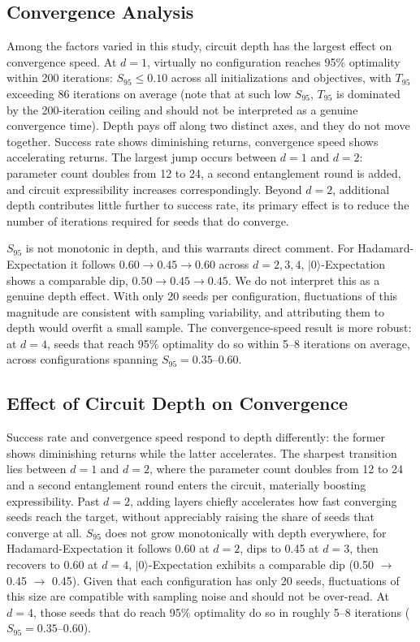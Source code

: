 \documentclass[runningheads]{llncs}
\begin{document}
\subsection{Convergence Analysis}

Among the factors varied in this study, circuit depth has the largest effect on convergence speed. At $d = 1$, virtually no configuration reaches 95\% optimality within 200 iterations: $S_{95} \leq 0.10$ across all initializations and objectives, with $T_{95}$ exceeding 86 iterations on average (note that at such low $S_{95}$, $T_{95}$ is dominated by the 200-iteration ceiling and should not be interpreted as a genuine convergence time). Depth pays off along two distinct axes, and they do not move together. Success rate shows diminishing returns, convergence speed shows accelerating returns. The largest jump occurs between $d=1$ and $d=2$: parameter count doubles from 12 to 24, a second entanglement round is added, and circuit expressibility increases correspondingly. Beyond $d=2$, additional depth contributes little further to success rate, its primary effect is to reduce the number of iterations required for seeds that do converge.

$S_{95}$ is not monotonic in depth, and this warrants direct comment. For Hadamard-Expectation it follows $0.60 \to 0.45 \to 0.60$ across $d = 2, 3, 4$, $|0\rangle$-Expectation shows a comparable dip, $0.50 \to 0.45 \to 0.45$. We do not interpret this as a genuine depth effect. With only 20 seeds per configuration, fluctuations of this magnitude are consistent with sampling variability, and attributing them to depth would overfit a small sample. The convergence-speed result is more robust: at $d=4$, seeds that reach 95\% optimality do so within 5--8 iterations on average, across configurations spanning $S_{95} = 0.35$--$0.60$.

\subsection{Effect of Circuit Depth on Convergence}
Success rate and convergence speed respond to depth differently: the former shows diminishing returns while the latter accelerates. The sharpest transition lies between $d = 1$ and $d = 2$, where the parameter count doubles from 12 to 24 and a second entanglement round enters the circuit, materially boosting expressibility. Past $d = 2$, adding layers chiefly accelerates how fast converging seeds reach the target, without appreciably raising the share of seeds that converge at all. $S_{95}$ does not grow monotonically with depth everywhere, for Hadamard-Expectation it follows 0.60 at $d = 2$, dips to 0.45 at $d = 3$, then recovers to 0.60 at $d = 4$, $|0\rangle$-Expectation exhibits a comparable dip (0.50 $\to$ 0.45 $\to$ 0.45). Given that each configuration has only 20 seeds, fluctuations of this size are compatible with sampling noise and should not be over-read. At $d = 4$, those seeds that do reach 95\% optimality do so in roughly 5--8 iterations ($S_{95} = 0.35$--$0.60$).
\end{document}
